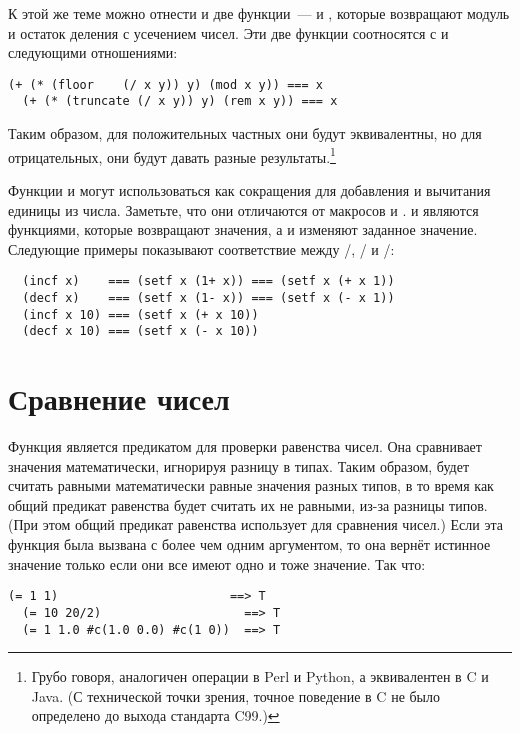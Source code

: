 К этой же теме можно отнести и две функции~---  и , которые возвращают
модуль и остаток деления с усечением чисел.  Эти две функции соотносятся с  и
 следующими отношениями:
  
\begin{lstlisting}[style=lisprepl]
  (+ (* (floor    (/ x y)) y) (mod x y)) === x
  (+ (* (truncate (/ x y)) y) (rem x y)) === x
\end{lstlisting}

Таким образом, для положительных частных они будут эквивалентны, но для отрицательных, они
будут давать разные результаты.\footnote{Грубо говоря,  аналогичен операции
  \code{\%} в Perl и Python, а  эквивалентен \code{\%} в C и Java. (С
  технической точки зрения, точное поведение \code{\%} в C не было определено до выхода
  стандарта C99.)}

Функции  и  могут использоваться как сокращения для добавления и
вычитания единицы из числа.  Заметьте, что они отличаются от макросов  и
.   и  являются функциями, которые возвращают значения, а
 и  изменяют заданное значение.  Следующие примеры показывают
соответствие между /, / и \code{+}/\code{-}:

\begin{lstlisting}
  (incf x)    === (setf x (1+ x)) === (setf x (+ x 1))
  (decf x)    === (setf x (1- x)) === (setf x (- x 1))
  (incf x 10) === (setf x (+ x 10))
  (decf x 10) === (setf x (- x 10))
\end{lstlisting}

\section{Сравнение чисел}

Функция \code{=} является предикатом для проверки равенства чисел.  Она сравнивает
значения математически, игнорируя разницу в типах.  Таким образом, \code{=} будет считать
равными математически равные значения разных типов, в то время как общий предикат
равенства  будет считать их не равными, из-за разницы типов. (При этом общий
предикат равенства  использует \code{=} для сравнения чисел.)  Если эта
функция была вызвана с более чем одним аргументом, то она вернёт истинное значение только
если они все имеют одно и тоже значение. Так что:

\begin{lstlisting}[style=lisprepl]
  (= 1 1)                        ==> T
  (= 10 20/2)                    ==> T
  (= 1 1.0 #c(1.0 0.0) #c(1 0))  ==> T
\end{lstlisting}

